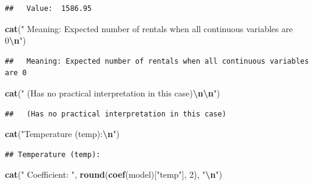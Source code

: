 \documentclass[
]{article}
\newenvironment{Shaded}{\begin{snugshade}}{\end{snugshade}}
\newcommand{\DecValTok}[1]{\textcolor[rgb]{0.00,0.00,0.81}{#1}}
\newcommand{\FunctionTok}[1]{\textcolor[rgb]{0.13,0.29,0.53}{\textbf{#1}}}
\newcommand{\NormalTok}[1]{#1}
\newcommand{\SpecialCharTok}[1]{\textcolor[rgb]{0.81,0.36,0.00}{\textbf{#1}}}
\newcommand{\StringTok}[1]{\textcolor[rgb]{0.31,0.60,0.02}{#1}}
\begin{document}
\begin{verbatim}
##   Value:  1586.95
\end{verbatim}

\begin{Shaded}
\begin{Highlighting}[]
\FunctionTok{cat}\NormalTok{(}\StringTok{"  Meaning: Expected number of rentals when all continuous variables are 0}\SpecialCharTok{\textbackslash{}n}\StringTok{"}\NormalTok{)}
\end{Highlighting}
\end{Shaded}

\begin{verbatim}
##   Meaning: Expected number of rentals when all continuous variables are 0
\end{verbatim}

\begin{Shaded}
\begin{Highlighting}[]
\FunctionTok{cat}\NormalTok{(}\StringTok{"  (Has no practical interpretation in this case)}\SpecialCharTok{\textbackslash{}n\textbackslash{}n}\StringTok{"}\NormalTok{)}
\end{Highlighting}
\end{Shaded}

\begin{verbatim}
##   (Has no practical interpretation in this case)
\end{verbatim}

\begin{Shaded}
\begin{Highlighting}[]
\FunctionTok{cat}\NormalTok{(}\StringTok{"Temperature (temp):}\SpecialCharTok{\textbackslash{}n}\StringTok{"}\NormalTok{)}
\end{Highlighting}
\end{Shaded}

\begin{verbatim}
## Temperature (temp):
\end{verbatim}

\begin{Shaded}
\begin{Highlighting}[]
\FunctionTok{cat}\NormalTok{(}\StringTok{"  Coefficient: "}\NormalTok{, }\FunctionTok{round}\NormalTok{(}\FunctionTok{coef}\NormalTok{(model)[}\StringTok{"temp"}\NormalTok{], }\DecValTok{2}\NormalTok{), }\StringTok{"}\SpecialCharTok{\textbackslash{}n}\StringTok{"}\NormalTok{)}
\end{Highlighting}
\end{Shaded}
\end{document}
